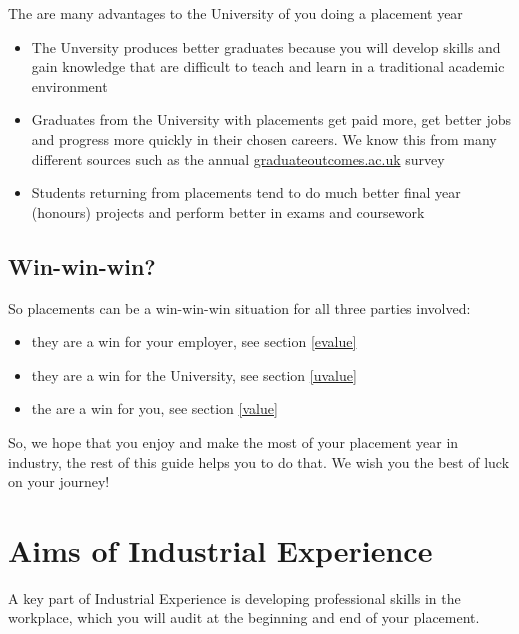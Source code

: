 \documentclass[
]{book}
\providecommand{\tightlist}{%
  \setlength{\itemsep}{0pt}\setlength{\parskip}{0pt}}
\begin{document}
The are many advantages to the University of you doing a placement year

\begin{itemize}
\tightlist
\item
  The Unversity produces better graduates because you will develop skills and gain knowledge that are difficult to teach and learn in a traditional academic environment
\item
  Graduates from the University with placements get paid more, get better jobs and progress more quickly in their chosen careers. We know this from many different sources such as the annual \href{https://www.graduateoutcomes.ac.uk/}{graduateoutcomes.ac.uk} survey
\item
  Students returning from placements tend to do much better final year (honours) projects and perform better in exams and coursework
\end{itemize}

\section{Win-win-win?}\label{win}

So placements can be a win-win-win situation for all three parties involved:

\begin{itemize}
\tightlist
\item
  they are a win for your employer, see section \ref{evalue}
\item
  they are a win for the University, see section \ref{uvalue}
\item
  the are a win for you, see section \ref{value}
\end{itemize}

So, we hope that you enjoy and make the most of your placement year in industry, the rest of this guide helps you to do that. We wish you the best of luck on your journey!

\chapter{Aims of Industrial Experience}\label{aims}

A key part of Industrial Experience is developing professional skills in the workplace, which you will audit at the beginning and end of your placement.
\end{document}
